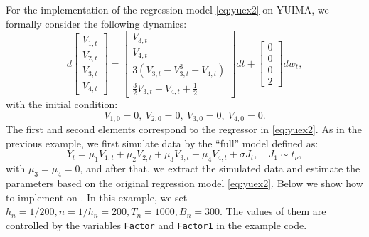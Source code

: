 For the implementation of the regression model \eqref{eq:yuex2} on YUIMA, we formally consider the following dynamics:
\begin{equation}
d\left[\begin{array}{c} V_{1,t}\\ V_{2,t}\\ V_{3,t}\\ V_{4,t}\end{array}\right]=\left[\begin{array}{c} V_{3,t}\\ V_{4,t}\\ 3(V_{3,t}-V_{3,t}^3-V_{4,t})\\ \frac{3}{2}V_{3,t}-V_{4,t}+\frac{1}{2}\end{array}\right]dt+\left[\begin{array}{c} 0\\ 0\\0\\2\end{array}\right]dw_t,
\end{equation}
with the initial condition:
\[
V_{1,0}=0, \ V_{2,0}=0, \ V_{3,0}=0, \ V_{4,0}=0.
\]
The first and second elements correspond to the regressor in \eqref{eq:yuex2}.
As in the previous example, we first simulate data by the ``full'' model defined as:
\begin{equation}
Y_t=\mu_1 V_{1,t}+\mu_2V_{2,t}+\mu_3V_{3,t}+\mu_4V_{4,t}+\sigma J_t,\quad J_1\sim t_\nu,
\end{equation}
with \(\mu_3=\mu_4=0\), and after that, we extract the simulated data and estimate the parameters based on the original regression model \eqref{eq:yuex2}.
Below we show how to implement on .
In this example, we set \(h_n=1/200, n=1/h_n=200, T_n=1000, B_n=300\).
The values of them are controlled by the variables \texttt{Factor} and \texttt{Factor1} in the example code.

